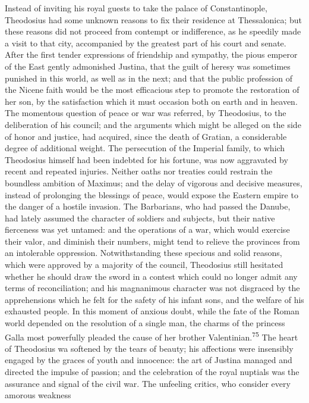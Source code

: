 Instead of inviting his royal guests to take the palace of
Constantinople, Theodosius had some unknown reasons to fix their
residence at Thessalonica; but these reasons did not proceed from
contempt or indifference, as he speedily made a visit to that
city, accompanied by the greatest part of his court and senate.
After the first tender expressions of friendship and sympathy,
the pious emperor of the East gently admonished Justina, that the
guilt of heresy was sometimes punished in this world, as well as
in the next; and that the public profession of the Nicene faith
would be the most efficacious step to promote the restoration of
her son, by the satisfaction which it must occasion both on earth
and in heaven. The momentous question of peace or war was
referred, by Theodosius, to the deliberation of his council; and
the arguments which might be alleged on the side of honor and
justice, had acquired, since the death of Gratian, a considerable
degree of additional weight. The persecution of the Imperial
family, to which Theodosius himself had been indebted for his
fortune, was now aggravated by recent and repeated injuries.
Neither oaths nor treaties could restrain the boundless ambition
of Maximus; and the delay of vigorous and decisive measures,
instead of prolonging the blessings of peace, would expose the
Eastern empire to the danger of a hostile invasion. The
Barbarians, who had passed the Danube, had lately assumed the
character of soldiers and subjects, but their native fierceness
was yet untamed: and the operations of a war, which would
exercise their valor, and diminish their numbers, might tend to
relieve the provinces from an intolerable oppression.
Notwithstanding these specious and solid reasons, which were
approved by a majority of the council, Theodosius still hesitated
whether he should draw the sword in a contest which could no
longer admit any terms of reconciliation; and his magnanimous
character was not disgraced by the apprehensions which he felt
for the safety of his infant sons, and the welfare of his
exhausted people. In this moment of anxious doubt, while the fate
of the Roman world depended on the resolution of a single man,
the charms of the princess Galla most powerfully pleaded the
cause of her brother Valentinian.\textsuperscript{75} The heart of Theodosius wa
softened by the tears of beauty; his affections were insensibly
engaged by the graces of youth and innocence: the art of Justina
managed and directed the impulse of passion; and the celebration
of the royal nuptials was the assurance and signal of the civil
war. The unfeeling critics, who consider every amorous weakness
